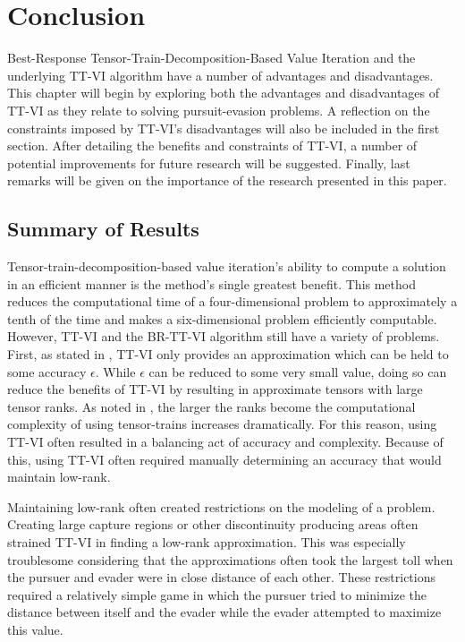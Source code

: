 \chapter{Conclusion}\label{chp:con}
Best-Response Tensor-Train-Decomposition-Based Value Iteration and the underlying TT-VI algorithm have a number of advantages and disadvantages. This chapter will begin by exploring both the advantages and disadvantages of TT-VI as they relate to solving pursuit-evasion problems. A reflection on the constraints imposed by TT-VI's disadvantages will also be included in the first section. After detailing the benefits and constraints of TT-VI, a number of potential improvements for future research will be suggested. Finally, last remarks will be given on the importance of the research presented in this paper.  

\section{Summary of Results}
Tensor-train-decomposition-based value iteration's ability to compute a solution in an efficient manner is the method's single greatest benefit. This method reduces the computational time of a four-dimensional problem to approximately a tenth of the time and makes a six-dimensional problem efficiently computable. However, TT-VI and the BR-TT-VI algorithm still have a variety of problems. First, as stated in , TT-VI only provides an approximation which can be held to some accuracy $\epsilon$. While $\epsilon$ can be reduced to some very small value, doing so can reduce the benefits of TT-VI by resulting in approximate tensors with large tensor ranks. As noted in , the larger the ranks become the computational complexity of using tensor-trains increases dramatically. For this reason, using TT-VI often resulted in a balancing act of accuracy and complexity. Because of this, using TT-VI often required manually determining an accuracy that would maintain low-rank.

Maintaining low-rank often created restrictions on the modeling of a problem. Creating large capture regions or other discontinuity producing areas often strained TT-VI in finding a low-rank approximation. This was especially troublesome considering that the approximations often took the largest toll when the pursuer and evader were in close distance of each other. These restrictions required a relatively simple game in which the pursuer tried to minimize the distance between itself and the evader while the evader attempted to maximize this value.

